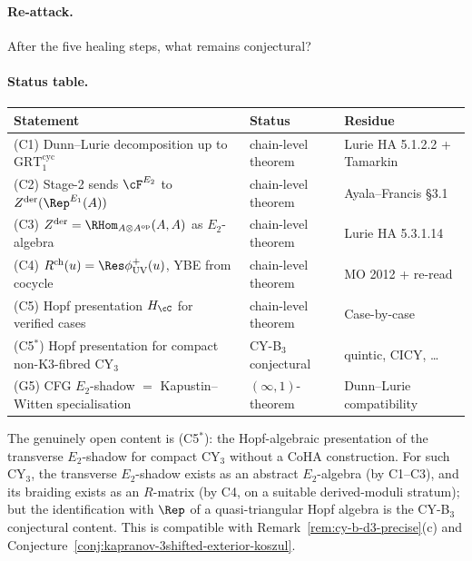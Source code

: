 \paragraph{Re-attack.}  After the five healing steps, what remains
conjectural?

\paragraph{Status table.}
\begin{center}
\renewcommand{\arraystretch}{1.3}
\begin{tabular}{lll}
 \toprule
 \textbf{Statement} & \textbf{Status} & \textbf{Residue} \\
 \midrule
 (C1) Dunn--Lurie decomposition up to $\mathrm{GRT}_1^{\mathrm{cyc}}$ &
 chain-level theorem &
 Lurie HA 5.1.2.2 + Tamarkin \\
 (C2) Stage-2 sends $\cF^{E_2}$ to $Z^{\mathrm{der}}(\Rep^{E_1}(A))$ &
 chain-level theorem &
 Ayala--Francis \S 3.1 \\
 (C3) $Z^{\mathrm{der}} = \RHom_{A\otimes A^{\mathrm{op}}}(A, A)$ as
 $E_2$-algebra &
 chain-level theorem &
 Lurie HA 5.3.1.14 \\
 (C4) $R^{\mathrm{ch}}(u) = \Res \phi^+_{\mathrm{UV}}(u)$, YBE from
 cocycle & chain-level theorem &
 MO 2012 + re-read \\
 (C5) Hopf presentation $H_\cC$ for verified cases &
 chain-level theorem &
 Case-by-case \\
 (C5$^*$) Hopf presentation for compact non-K3-fibred CY$_3$ &
 CY-B$_3$ conjectural &
 quintic, CICY, \ldots \\
 (G5) CFG $E_2$-shadow $=$ Kapustin--Witten specialisation &
 $(\infty, 1)$-theorem &
 Dunn--Lurie compatibility \\
 \bottomrule
\end{tabular}
\end{center}

The genuinely open content is (C5$^*$): the Hopf-algebraic presentation
of the transverse $E_2$-shadow for compact CY$_3$ without a CoHA
construction.  For such CY$_3$, the transverse $E_2$-shadow exists as
an abstract $E_2$-algebra (by C1--C3), and its braiding exists as an
$R$-matrix (by C4, on a suitable derived-moduli stratum); but the
identification with $\Rep$ of a quasi-triangular Hopf algebra is the
CY-B$_3$ conjectural content.  This is compatible with
Remark~\ref{rem:cy-b-d3-precise}(c) and
Conjecture~\ref{conj:kapranov-3shifted-exterior-koszul}.


